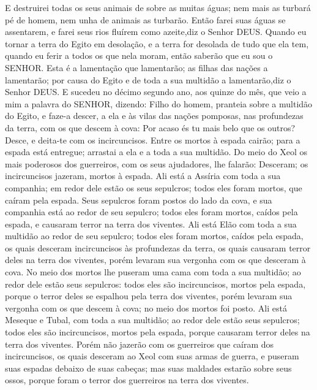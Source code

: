 {  E destruirei todas os seus animais de sobre as muitas águas; nem mais as turbará pé de homem, nem unha de animais as turbarão.
  Então farei suas águas se assentarem, e farei seus rios fluírem como azeite,diz o Senhor DEUS.
  Quando eu tornar a terra do Egito em desolação, e a terra for desolada de tudo que ela tem,
 quando eu ferir a todos os que nela moram, então saberão que eu sou o SENHOR.
  Esta é a lamentação que lamentarão; as filhas das nações a lamentarão; por causa do Egito e de toda a sua multidão a lamentarão,diz o Senhor DEUS.
  E sucedeu no décimo segundo ano, aos quinze do mês, que veio a mim a palavra do SENHOR, dizendo:
  Filho do homem, pranteia sobre a multidão do Egito, e faze-a descer, a ela e às vilas das nações pomposas, nas profundezas da terra, com os que descem à cova:
  Por acaso és tu mais belo que os outros? Desce, e deita-te com os incircuncisos.
  Entre os mortos à espada cairão; para a espada está entregue; arrastai a ela
 e a toda a sua multidão.
  Do meio do Xeol
 os mais poderosos dos guerreiros, com os seus ajudadores, lhe falarão: Desceram; os incircuncisos jazeram, mortos à espada.
  Ali está a Assíria com toda a sua companhia; em redor dele estão os seus sepulcros; todos eles foram mortos, que caíram pela espada.
  Seus sepulcros foram postos do lado da cova, e sua companhia está ao redor de seu sepulcro; todos eles foram mortos, caídos pela espada, e causaram terror na terra dos viventes.
  Ali está Elão com toda a sua multidão ao redor de seu sepulcro; todos eles foram mortos, caídos pela espada, os quais desceram incircuncisos às profundezas da terra, os quais causaram terror deles na terra dos viventes, porém levaram sua vergonha com os que desceram à cova.
  No meio dos mortos lhe puseram uma cama com toda a sua multidão; ao redor dele estão seus sepulcros: todos eles são incircuncisos, mortos pela espada, porque o terror deles se espalhou pela terra dos viventes, porém levaram sua vergonha com os que descem à cova; no meio dos mortos foi posto.
  Ali está Meseque e Tubal, com toda a sua multidão; ao redor dele estão seus sepulcros; todos eles são incircuncisos, mortos pela espada, porque causaram terror deles na terra dos viventes.
  Porém não jazerão com os guerreiros que caíram dos incircuncisos, os quais desceram ao Xeol com suas armas de guerra, e puseram suas espadas debaixo de suas cabeças; mas suas maldades estarão sobre seus ossos, porque foram o terror dos guerreiros na terra dos viventes.
}
